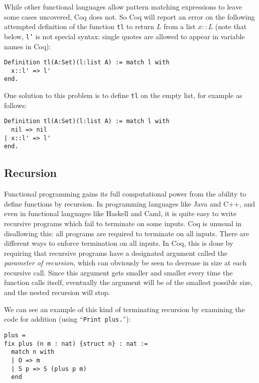 \documentclass{book}[12pt]
\begin{document}
While other functional languages allow pattern matching expressions to
leave some cases uncovered, Coq does not.  So Coq will report an error
on the following attempted definition of the function \texttt{tl} to
return $L$ from a list $x::L$ (note that below, \texttt{l'} is not
special syntax: single quotes are allowed to appear in variable
names in Coq):

\begin{verbatim}
Definition tl(A:Set)(l:list A) := match l with
  x::l' => l'
end.
\end{verbatim}

\noindent One solution to this problem is to define \texttt{tl} on
the empty list, for example as follows:

\begin{verbatim}
Definition tl(A:Set)(l:list A) := match l with
  nil => nil
| x::l' => l'
end.
\end{verbatim}

\subsection{Recursion}
\label{sec:rec}

Functional programming gains its full computational power from the
ability to define functions by recursion.  In programming languages
like Java and C++, and even in functional languages like Haskell and
Caml, it is quite easy to write recursive programs which fail to
terminate on some inputs.  Coq is unusual in disallowing this: all
programs are required to terminate on all inputs.  There are different
ways to enforce termination on all inputs.  In Coq, this is done by
requiring that recursive programs have a designated argument called
the \emph{parameter of recursion}, which can obviously be seen to
decrease in size at each recursive call.  Since this argument gets
smaller and smaller every time the function calls itself, eventually
the argument will be of the smallest possible size, and the nested
recursion will stop.

We can see an example of this kind of terminating recursion by
examining the code for addition (using ``\texttt{Print plus.}''):

\begin{verbatim}
plus = 
fix plus (n m : nat) {struct n} : nat :=
  match n with
  | O => m
  | S p => S (plus p m)
  end
\end{verbatim}
\end{document}
